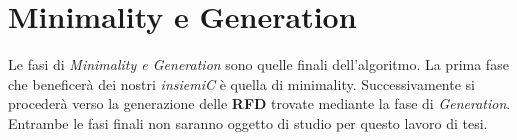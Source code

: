 \section{Minimality e Generation}
Le fasi di \emph{Minimality e Generation} sono quelle finali dell'algoritmo. La prima fase che beneficerà dei nostri \emph{insiemiC} è quella di minimality. Successivamente si procederà verso la generazione delle \textbf{RFD} trovate mediante la fase di \emph{Generation}. Entrambe le fasi finali non saranno oggetto di studio per questo lavoro di tesi.